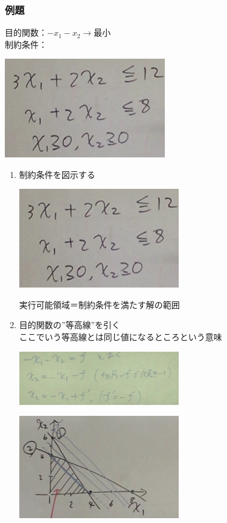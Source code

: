 \documentclass{jsarticle}
\begin{document}
{{\subsubsection{例題}
目的関数：$-x_1-x_2→最小$\\
制約条件：
\begin{center}
	\includegraphics[width=7cm]{12_17_1.JPG}
\end{center}
\begin{enumerate}
\item 制約条件を図示する
	\begin{center}
		\includegraphics[width=7cm]{12_17_1.JPG}
	\end{center}
	実行可能領域＝制約条件を満たす解の範囲
\item 目的関数の”等高線”を引く\\
	ここでいう等高線とは同じ値になるところという意味\\
	\begin{center}
		\includegraphics[width=7cm]{12_17_3.JPG}
	\end{center}
	\begin{center}
		\includegraphics[width=7cm]{12_17_4.JPG}
	\end{center}


\end{enumerate}}}
\end{document}
